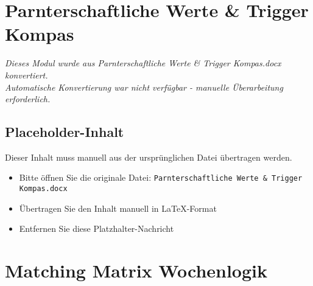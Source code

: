 


\section{Parnterschaftliche Werte & Trigger Kompas}
\label{sec:parnterschaftliche-werte-&-trigger-kompas}

\begin{center}
\textit{Dieses Modul wurde aus Parnterschaftliche Werte & Trigger Kompas.docx konvertiert.\\
Automatische Konvertierung war nicht verfügbar - manuelle Überarbeitung erforderlich.}
\end{center}


\subsection{Placeholder-Inhalt}

Dieser Inhalt muss manuell aus der ursprünglichen Datei übertragen werden.

\begin{itemize}
\item Bitte öffnen Sie die originale Datei: \texttt{Parnterschaftliche Werte & Trigger Kompas.docx}
\item Übertragen Sie den Inhalt manuell in LaTeX-Format
\item Entfernen Sie diese Platzhalter-Nachricht
\end{itemize}




\section{Matching Matrix Wochenlogik}
\label{sec:matching-matrix-wochenlogik}


